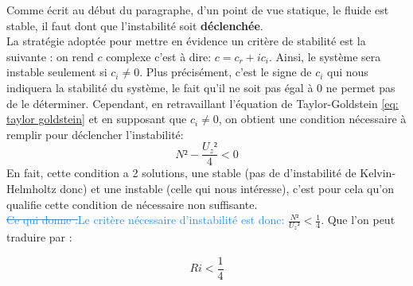 \documentclass{rapportECC}
\newcommand{\FAadd}[1]{\textcolor{DodgerBlue}{{#1}}}                     %
\newcommand{\FAdel}[1]{\textcolor{DodgerBlue}{\sout{#1}}}                %
\begin{document}
Comme écrit au début du paragraphe, d'un point de vue statique, le fluide est stable, il faut dont que l'instabilité soit \textbf{déclenchée}. \\

La stratégie adoptée pour mettre en évidence un critère de stabilité est la suivante : on rend $c$ complexe c'est à dire: $c = c_r + ic_i $. Ainsi, le système sera instable seulement si $c_i \neq 0$. Plus précisément, c'est le signe de $c_i$ qui nous indiquera la stabilité du système, le fait qu'il ne soit pas égal à 0 ne permet pas de le déterminer. Cependant, en retravaillant l'équation de Taylor-Goldstein \eqref{eq: taylor goldstein} et en supposant que $c_i \neq 0$, on obtient une condition nécessaire à remplir pour déclencher l'instabilité:
\begin{equation}
    N² - \frac{U_{z}²}{4} < 0
\end{equation}
En fait, cette condition a 2 solutions, une stable (pas de d'instabilité de Kelvin-Helmholtz donc) et une instable (celle qui nous intéresse), c'est pour cela qu'on qualifie cette condition de nécessaire non suffisante.\\
\FAdel{Ce qui donne :}\FAadd{Le critère nécessaire d'instabilité est donc:} $\frac{N²}{U_{z}²} < \frac{1}{4}$. 
Que l'on peut traduire par :

\begin{equation}
    Ri < \frac{1}{4}
\end{equation}
\end{document}
